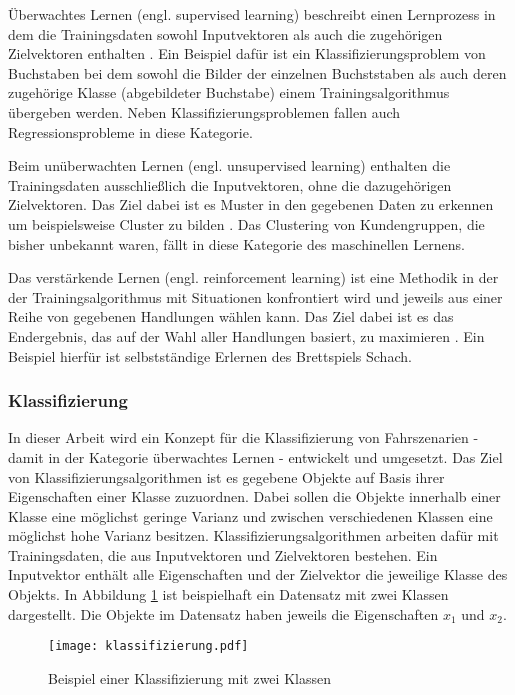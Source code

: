Überwachtes Lernen (engl. supervised learning) beschreibt einen Lernprozess in dem die Trainingsdaten sowohl Inputvektoren als auch die zugehörigen Zielvektoren enthalten \cite{bishop2006pattern}. Ein Beispiel dafür ist ein Klassifizierungsproblem von Buchstaben bei dem sowohl die Bilder der einzelnen Buchststaben als auch deren zugehörige Klasse (abgebildeter Buchstabe) einem Trainingsalgorithmus übergeben werden. Neben Klassifizierungsproblemen fallen auch Regressionsprobleme in diese Kategorie.

Beim unüberwachten Lernen (engl. unsupervised learning) enthalten die Trainingsdaten ausschließlich die Inputvektoren, ohne die dazugehörigen Zielvektoren. Das Ziel dabei ist es Muster in den gegebenen Daten zu erkennen um beispielsweise Cluster zu bilden \cite{bishop2006pattern}. Das Clustering von Kundengruppen, die bisher unbekannt waren, fällt in diese Kategorie des maschinellen Lernens.

Das verstärkende Lernen (engl. reinforcement learning) ist eine Methodik in der der Trainingsalgorithmus mit Situationen konfrontiert wird und jeweils aus einer Reihe von gegebenen Handlungen wählen kann. Das Ziel dabei ist es das Endergebnis, das auf der Wahl aller Handlungen basiert, zu maximieren \cite{sutton1998introduction}. Ein Beispiel hierfür ist selbstständige Erlernen des Brettspiels Schach.


\subsubsection{Klassifizierung}

In dieser Arbeit wird ein Konzept für die Klassifizierung von Fahrszenarien - damit in der Kategorie überwachtes Lernen - entwickelt und umgesetzt. Das Ziel von Klassifizierungsalgorithmen ist es gegebene Objekte auf Basis ihrer Eigenschaften einer Klasse zuzuordnen. Dabei sollen die Objekte innerhalb einer Klasse eine möglichst geringe Varianz und zwischen verschiedenen Klassen eine möglichst hohe Varianz besitzen. Klassifizierungsalgorithmen arbeiten dafür mit Trainingsdaten, die aus Inputvektoren und Zielvektoren bestehen. Ein Inputvektor enthält alle Eigenschaften und der Zielvektor die jeweilige Klasse des Objekts. In Abbildung \ref{fig_klassifizierung} ist beispielhaft ein Datensatz mit zwei Klassen dargestellt. Die Objekte im Datensatz haben jeweils die Eigenschaften $x_1$ und $x_2$.

\begin{figure}[h]
\centering
\texttt{[image: klassifizierung.pdf]}
\caption{Beispiel einer Klassifizierung mit zwei Klassen}
\label{fig_klassifizierung}
\end{figure}

